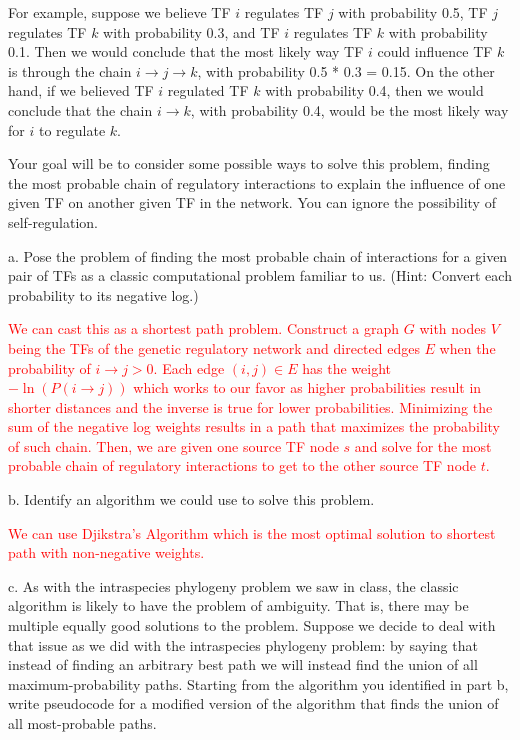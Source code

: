 \documentclass[11pt]{article}
\begin{document}
For example, suppose we believe TF $i$ regulates TF $j$
with probability 0.5, TF $j$ regulates TF $k$ with
probability 0.3, and TF $i$ regulates TF $k$ with
probability 0.1.  Then we would conclude that the most likely way
TF $i$ could influence TF $k$ is through the chain $i
\rightarrow j \rightarrow k$, with probability 0.5 * 0.3 = 0.15.  On
the other hand, if we believed TF $i$ regulated TF $k$ with
probability 0.4, then we would conclude that the chain $i \rightarrow
k$, with probability 0.4, would be the most likely way for $i$ to
regulate $k$.

Your goal will be to consider some possible ways to solve this
problem, finding the most probable chain of regulatory interactions to explain the influence of one given TF on another given TF in the
network.  You can ignore the possibility of self-regulation.

a. Pose the problem of finding the most probable chain of interactions
for a given pair of TFs as a classic computational problem
familiar to us.  (Hint: Convert each probability to its negative log.)

\textcolor{red}{
We can cast this as a shortest path problem. Construct a graph $G$ with nodes $V$ being the TFs of the genetic regulatory network and directed edges $E$ when the probability of $i \rightarrow j > 0$. Each edge $(i, j) \in E$ has the weight $-\ln(P(i \rightarrow j))$ which works to our favor as higher probabilities result in shorter distances and the inverse is true for lower probabilities. Minimizing the sum of the negative log weights results in a path that maximizes the probability of such chain. Then, we are given one source TF node $s$ and solve for the most probable chain of regulatory interactions to get to the other source TF node $t$.
}

b. Identify an algorithm we could use to solve this problem.

\textcolor{red}{
We can use Djikstra's Algorithm which is the most optimal solution to shortest path with non-negative weights.
}

c. As with the intraspecies phylogeny problem we saw in class, the
classic algorithm is likely to have the problem of ambiguity.  That
is, there may be multiple equally good solutions to the problem.
Suppose we decide to deal with that issue as we did with the
intraspecies phylogeny problem: by saying that instead of finding an
arbitrary best path we will instead find the union of all
maximum-probability paths.  Starting from the algorithm you identified
in part b, write pseudocode for a modified version of the algorithm
that finds the union of all most-probable paths.
\end{document}

